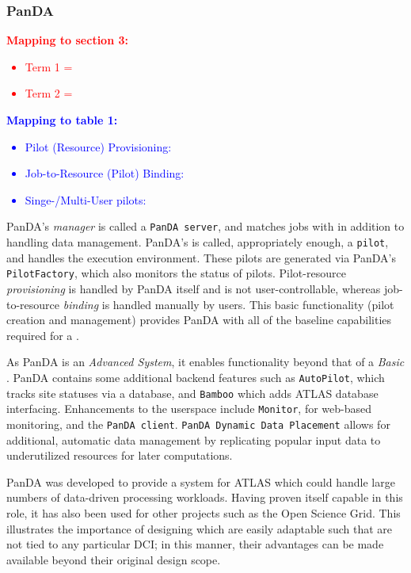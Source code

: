 \documentclass{sig-alternate}
\begin{document}
\subsubsection{PanDA}

\textcolor{red}
{
\textbf{Mapping to section 3:}
\begin{itemize}
\item Term 1 =
\item Term 2 =
\end{itemize}
}

\textcolor{blue}
{
\textbf{Mapping to table 1:}
\begin{itemize}
\item Pilot (Resource) Provisioning:
\item Job-to-Resource (Pilot) Binding:
\item Singe-/Multi-User pilots:
\end{itemize}
}

PanDA's \textit{manager} is called a \texttt{PanDA server}, and matches
jobs with \pilots in addition to handling data management.
PanDA's \textit{\pilot}
is called, appropriately enough, a \texttt{pilot}, and handles the execution
environment.  These pilots are generated via PanDA's \texttt{PilotFactory},
which also monitors the status of pilots.
Pilot-resource \textit{provisioning} is handled by PanDA itself and is not 
user-controllable, whereas job-to-resource \textit{binding} is handled
manually by users.
This basic functionality (pilot creation and management) provides 
PanDA with all of the baseline capabilities required for a \pilotjob.

As PanDA is an \textit{Advanced \pilotjob System}, it enables functionality
beyond that of a \textit{Basic \pilotjob}.
PanDA contains some additional backend features such as \texttt{AutoPilot}, which
tracks site statuses via a database, and \texttt{Bamboo} which adds
ATLAS database interfacing.  Enhancements to the userspace include 
\texttt{Monitor}, for web-based monitoring, and the \texttt{PanDA client}.
\texttt{PanDA Dynamic Data Placement} \cite{maeno_pd2p:_2012} 
allows for additional, automatic data
management by replicating popular input data to underutilized resources
for later computations.

PanDA was developed to provide a \pilotjob system for ATLAS which could
handle large numbers of data-driven processing workloads.  Having proven itself
capable in this role, it has also been used for other projects such
as the Open Science Grid.  This illustrates the importance of designing
\pilotjobs which are easily adaptable such that \pilots are not tied
to any particular DCI; in this manner, their advantages can be made
available beyond their original design scope.
\end{document}
